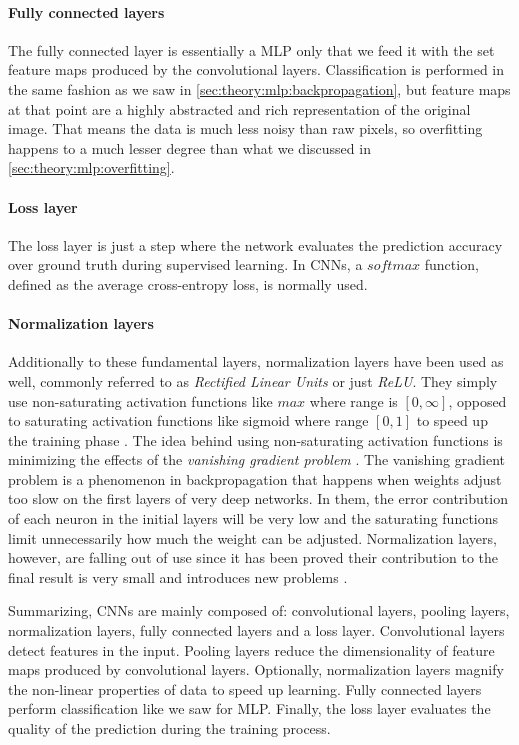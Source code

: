\paragraph{Fully connected layers}
The fully connected layer is essentially a MLP only that we feed it with the set feature maps produced by the convolutional layers.
Classification is performed in the same fashion as we saw in \autoref{sec:theory:mlp:backpropagation}, but feature maps at that point are a highly abstracted and rich representation of the original image.
That means the data is much less noisy than raw pixels, so overfitting happens to a much lesser degree than what we discussed in \autoref{sec:theory:mlp:overfitting}.

\paragraph{Loss layer}
The loss layer is just a step where the network evaluates the prediction accuracy over ground truth during supervised learning.
In CNNs, a $softmax$ function, defined as the average cross-entropy loss, is normally used.

\paragraph{Normalization layers}
Additionally to these fundamental layers, normalization layers have been used as well, commonly referred to as \emph{Rectified Linear Units} or just \emph{ReLU}.
They simply use non-saturating activation functions like $max$ where range is $[0,\infty]$, opposed to saturating activation functions  like sigmoid where range $[0,1]$ to speed up the training phase \cite{Krizhevsky2012,Nair2010}.
The idea behind using non-saturating activation functions is minimizing the effects of the \emph{vanishing gradient problem} \cite{Socher2015}.
The vanishing gradient problem is a phenomenon in backpropagation that happens when weights adjust too slow on the first layers of very deep networks.
In them, the error contribution of each neuron in the initial layers will be very low and the saturating functions limit unnecessarily how much the weight can be adjusted.
Normalization layers, however, are falling out of use since it has been proved their contribution to the final result is very small and introduces new problems \cite{Lo2015}.

Summarizing, CNNs are mainly composed of: convolutional layers, pooling layers, normalization layers, fully connected layers and a loss layer.
Convolutional layers detect features in the input.
Pooling layers reduce the dimensionality of feature maps produced by convolutional layers.
Optionally, normalization layers magnify the non-linear properties of data to speed up learning.
Fully connected layers perform classification like we saw for MLP.
Finally, the loss layer evaluates the quality of the prediction during the training process.


